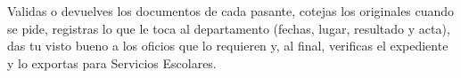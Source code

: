\documentclass[11pt,a4paper]{article}
\begin{document}
{\small\tableofcontents}
\newpage
\begin{quevasahacer}
Validas o devuelves los documentos de cada pasante, cotejas los originales cuando se pide, registras lo que le toca al departamento (fechas, lugar, resultado y acta), das tu visto bueno a los oficios que lo requieren y, al final, verificas el expediente y lo exportas para Servicios Escolares.
\end{quevasahacer}



\end{document}
